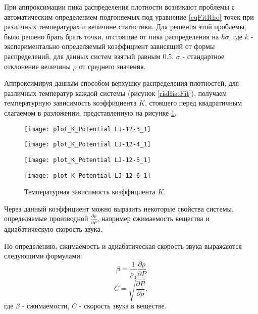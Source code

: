 При аппроксимации пика распределения плотности возникают проблемы с автоматическим определением подгоняемых под уравнение \ref{eqFitRho} точек при различных температурах и величине статистики. Для решения этой проблемы, было решено брать брать точки, отстоящие от пика распределения на $k\sigma$, где $k$ - экспериментально определяемый коэффициент зависящий от формы распределений, для данных систем взятый равным 0.5, $\sigma$ - стандартное отклонение величины $\rho$ от среднего значения.  

Аппроксимируя данным способом верхушку распределения плотностей, для различных температур каждой системы (рисунок \ref{risHistFit}), получаем температурную зависимость коэффициента $K$, стоящего перед квадратичным слагаемом в разложении, представленную на рисунке \ref{risK}.

\begin{figure}[htbp!]
\begin{center}
\begin{minipage}[h]{0.45\linewidth}
\texttt{[image: plot\_K\_Potential LJ-12-3\_1]}
\end{minipage}
\begin{minipage}[h]{0.45\linewidth}
\texttt{[image: plot\_K\_Potential LJ-12-4\_1]}
\end{minipage}

\begin{minipage}[h]{0.45\linewidth}
\texttt{[image: plot\_K\_Potential LJ-12-5\_1]}
\end{minipage}
\begin{minipage}[h]{0.45\linewidth}
\texttt{[image: plot\_K\_Potential LJ-12-6\_1]}
\end{minipage}
\caption{Температурная зависимость коэффициента $K$.}
\label{risK}
\end{center}
\end{figure}

Через данный коэффициент можно выразить некоторые свойства системы, определяемые производной $\frac{\partial \rho}{\partial P}$, например сжимаемость вещества и адиабатическую скорость звука.

По определению, сжимаемость и адиабатическая скорость звука выражаются следующими формулами:
\begin{equation}
\beta = \frac{1}{\rho_0} \frac{\partial \rho}{\partial P}
\label{eqBetaClassic}
\end{equation}
\begin{equation}
C = \sqrt{\frac{\partial P}{\partial \rho}},
\label{eqCClassic}
\end{equation}
где $\beta$ - сжимаемости, $C$ - скорость звука в веществе.

